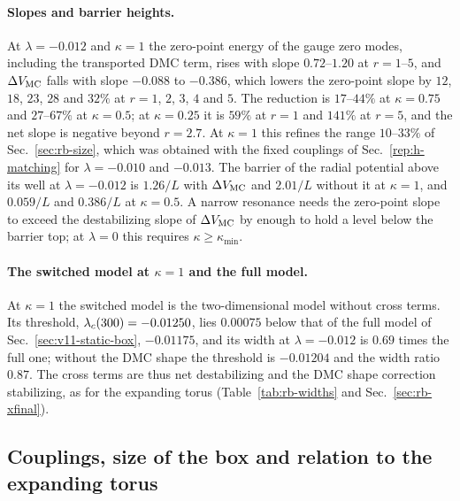 \paragraph{Slopes and barrier heights.}
At $\lambda=-0.012$ and $\kappa=1$ the zero-point energy of the gauge zero modes, including the transported DMC term, rises with slope $0.72$--$1.20$ at $r=1$--$5$, and $\Delta V_{\rm MC}$ falls with slope $-0.088$ to $-0.386$, which lowers the zero-point slope by $12$, $18$, $23$, $28$ and $32\%$ at $r=1$, $2$, $3$, $4$ and $5$. %
The reduction is $17$--$44\%$ at $\kappa=0.75$ and $27$--$67\%$ at $\kappa=0.5$; at $\kappa=0.25$ it is $59\%$ at $r=1$ and $141\%$ at $r=5$, and the net slope is negative beyond $r=2.7$. %
At $\kappa=1$ this refines the range $10$--$33\%$ of Sec.~\ref{sec:rb-size}, which was obtained with the fixed couplings of Sec.~\ref{rep:h-matching} for $\lambda=-0.010$ and $-0.013$. %
The barrier of the radial potential above its well at $\lambda=-0.012$ is $1.26/L$ with $\Delta V_{\rm MC}$ and $2.01/L$ without it at $\kappa=1$, and $0.059/L$ and $0.386/L$ at $\kappa=0.5$. %
A narrow resonance needs the zero-point slope to exceed the destabilizing slope of $\Delta V_{\rm MC}$ by enough to hold a level below the barrier top; at $\lambda=0$ this requires $\kappa\ge\kappa_{\min}$.

\paragraph{The switched model at $\kappa=1$ and the full model.}
At $\kappa=1$ the switched model is the two-dimensional model without cross terms.
Its threshold, $\lambda_c(300)=-0.01250$, lies $0.00075$ below that of the full model of Sec.~\ref{sec:v11-static-box}, $-0.01175$, and its width at $\lambda=-0.012$ is $0.69$ times the full one; without the DMC shape the threshold is $-0.01204$ and the width ratio $0.87$. %
The cross terms are thus net destabilizing and the DMC shape correction stabilizing, as for the expanding torus (Table~\ref{tab:rb-widths} and Sec.~\ref{sec:rb-xfinal}).

\subsection{Couplings, size of the box and relation to the expanding torus}
\label{sec:v11-static-torus}

